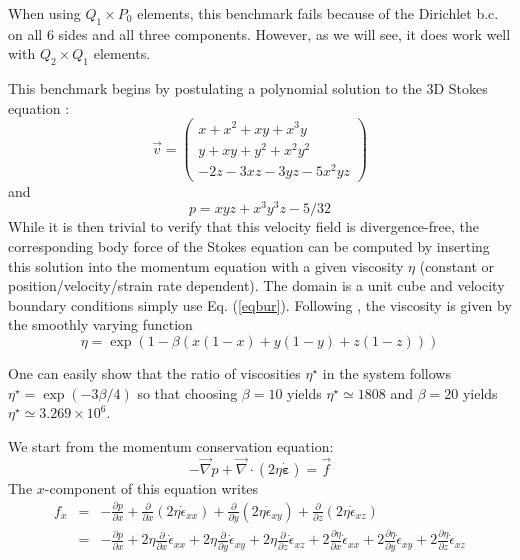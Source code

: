 

When using $Q_1 \times P_0$ elements, this benchmark fails 
 because of the Dirichlet b.c. on all 6 sides and all three components.
However, as we will see, it does work well with $Q_2 \times Q_1$ elements. 

This benchmark begins by postulating a polynomial solution to the 3D Stokes equation \cite{dobo04}:
\begin{equation}
\vec{v}
=
\left(
\begin{array}{c}
x+x^2+xy+x^3y \\
y + xy + y^2 + x^2 y^2\\
-2z - 3xz - 3yz - 5x^2 yz
\end{array}
\right)
\label{eqbur}
\end{equation}
and
\begin{equation}
p = xyz + x^3 y^3z - 5/32
\end{equation}
While it is then trivial to verify that this velocity field is divergence-free,  
the corresponding body force of the Stokes equation can be computed by 
inserting this solution into the momentum equation with a given viscosity $\eta$
(constant or position/velocity/strain rate dependent). 
The domain is a unit cube and velocity boundary conditions 
simply use Eq. (\ref{eqbur}). 
Following \cite{busa13}, the viscosity
is given by the smoothly varying function
\begin{equation}
\eta = \exp(1 - \beta(x(1 - x) + y(1 - y) + z(1 - z)))
\end{equation}

One can easily show that the ratio of viscosities $\eta^\star$
in the system follows $\eta^\star=\exp(-3\beta/4)$ so that choosing $\beta=10$ yields
$\eta^\star\simeq 1808$ and $\beta=20$ yields $\eta^\star\simeq 3.269\times10^6$.


We start from the momentum conservation equation:
\[
-{\vec \nabla}p + {\vec \nabla}\cdot (2 \eta \dot{\bm \varepsilon}) = {\vec f}
\]
The $x$-component of this equation writes
\begin{eqnarray}
f_x 
&=& -\frac{\partial p}{\partial x} 
+\frac{\partial}{\partial x} (2\eta \dot{\epsilon}_{xx})
+\frac{\partial}{\partial y} (2\eta \dot{\epsilon}_{xy})
+\frac{\partial}{\partial z} (2\eta \dot{\epsilon}_{xz}) \\
&=& 
-\frac{\partial p}{\partial x} 
+2\eta\frac{\partial}{\partial x} \dot{\epsilon}_{xx}
+2\eta\frac{\partial}{\partial y} \dot{\epsilon}_{xy}
+2\eta\frac{\partial}{\partial z} \dot{\epsilon}_{xz} 
+2\frac{\partial \eta}{\partial x} \dot{\epsilon}_{xx}
+2\frac{\partial \eta}{\partial y} \dot{\epsilon}_{xy}
+2\frac{\partial \eta}{\partial z} \dot{\epsilon}_{xz} 
\end{eqnarray}


